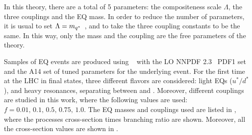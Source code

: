 In this theory, there are a total of 5 parameters: the compositeness scale \(\Lambda\), the three couplings and the \ac{EQ} mass. In order to reduce the number of parameters, it is usual to set \(\Lambda = m_{q^*}\)~\cite{Zhan_Li_Liu_Li-2016}, and to take the three coupling constants to be the same. In this way, only the mass and the coupling are the free parameters of the theory.

Samples of \ac{EQ} events are produced using ~\cite{Pythia8.2} with the \ac{LO} NNPDF 2.3~\cite{NNPDF2} \ac{PDF1} set and the A14 set of tuned parameters for the underlying event.
For the first time at the \ac{LHC} in \gammajet final states, three different flavors are considered: light \acp{EQ} \qstar (\(u^* / d^*\)), and heavy resonances, separating between \cstar and \bstar. Moreover, different couplings are studied in this work, where the following values are used: \(f = 0.01, \, 0.1, \, 0.5, \, 0.75, \, 1.0\). The \ac{EQ} masses and couplings used are listed in \Tab{\ref{tab:samples:samples:sig:qstar:xs}}, where the processes cross-section times branching ratio are shown. Moreover, all the cross-section values are shown in \Fig{\ref{tab:samples:samples:sig:qstar:xs}}.


